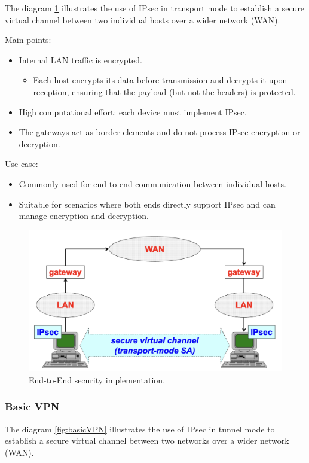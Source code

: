 The diagram \ref{fig:EESec} illustrates the use of IPsec in transport mode to establish a secure virtual channel between two individual hosts over a wider network (WAN).

Main points:
\begin{itemize}
    \item Internal LAN traffic is encrypted.
    \begin{itemize}
        \item Each host encrypts its data before transmission and decrypts it upon reception, ensuring that the payload (but not the headers) is protected.
    \end{itemize}
    \item High computational effort: each device must implement IPsec.
    \item The gateways act as border elements and do not process IPsec encryption or decryption.
\end{itemize}

Use case:
\begin{itemize}
    \item Commonly used for end-to-end communication between individual hosts.
    \item Suitable for scenarios where both ends directly support IPsec and can manage encryption and decryption.
\end{itemize}
\begin{figure}[H]
  \includegraphics[width=\linewidth]{Images/NetSec/end_to_end_security.png}
  \caption{End-to-End security implementation.}
  \label{fig:EESec}
\end{figure}

\subsubsection{Basic VPN}
The diagram \ref{fig:basicVPN} illustrates the use of IPsec in tunnel mode to establish a secure virtual channel between two networks over a wider network (WAN).


